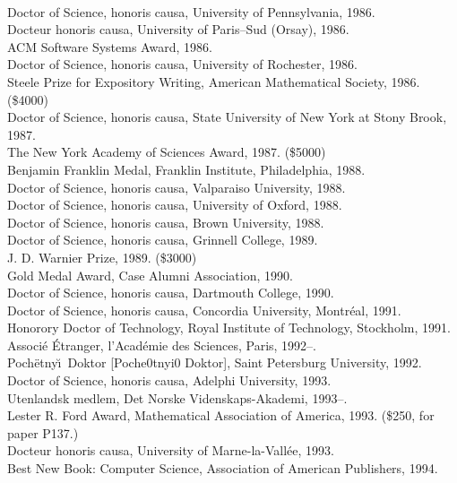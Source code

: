 \\Doctor of Science, honoris causa, University of Pennsylvania, 1986. %
\\Docteur honoris causa, University of Paris--Sud (Orsay), 1986. %
\\ACM Software Systems Award, 1986.
\\Doctor of Science, honoris causa, University of Rochester, 1986. %
\\Steele Prize for Expository Writing, American Mathematical
 Society, 1986. (\$4000)
\\Doctor of Science, honoris causa, State University of New York at Stony
 Brook, 1987. %
\\The New York Academy of Sciences Award, 1987. (\$5000)
\\Benjamin Franklin Medal, Franklin Institute, Philadelphia, 1988.
\\Doctor of Science, honoris causa, Valparaiso University, 1988. %
\\Doctor of Science, honoris causa, University of Oxford, 1988. %
\\Doctor of Science, honoris causa, Brown University, 1988. %
\\Doctor of Science, honoris causa, Grinnell College, 1989. %
\\J. D. Warnier Prize, 1989. (\$3000)
\\Gold Medal Award, Case Alumni Association, 1990.
\\Doctor of Science, honoris causa, Dartmouth College, 1990. %
\\Doctor of Science, honoris causa, Concordia University, Montr\'eal,
 1991. %
\\Honorory Doctor of Technology, Royal Institute of Technology,
 Stockholm, 1991. %
\\Associ\'e \'Etranger, l'Acad\'emie des Sciences, Paris, 1992--.
\\Poch\"etny\u\i\ Doktor [{\rus Poche0tnyi0 Doktor}],
 Saint Petersburg University, 1992. %
\\Doctor of Science, honoris causa, Adelphi University, 1993. %
\\Utenlandsk medlem, Det Norske Videnskaps-Akademi, 1993--.
\\Lester R. Ford Award, Mathematical Association of America, 1993.  (\$250, 
 for paper P137.)
\\Docteur honoris causa, University of Marne-la-Vall\'ee, 1993. %
\\Best New Book: Computer Science, Association of American Publishers, 1994.
